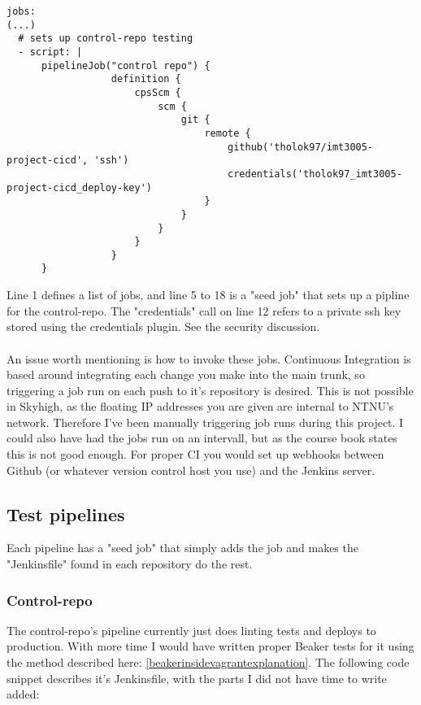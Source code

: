 \begin{verbatim}
jobs:
(...)
  # sets up control-repo testing
  - script: |
      pipelineJob("control repo") {
                  definition {
                      cpsScm {
                          scm {
                              git {
                                  remote {
                                      github('tholok97/imt3005-project-cicd', 'ssh')
                                      credentials('tholok97_imt3005-project-cicd_deploy-key')
                                  }
                              }
                          }
                      }
                  }
      }
\end{verbatim}

Line 1 defines a list of jobs, and line 5 to 18 is a "seed job" that sets up a pipline for the control-repo. The "credentials" call on line 12 refers to a private ssh key stored using the credentials plugin. See the security discussion.
\\
\\
An issue worth mentioning is how to invoke these jobs. Continuous Integration is based around integrating each change you make into the main trunk, so triggering a job run on each push to it's repository is desired. This is not possible in Skyhigh, as the floating IP addresses you are given are internal to NTNU's network. Therefore I've been manually triggering job runs during this project. I could also have had the jobs run on an intervall, but as the course book\cite{coursebook} states this is not good enough. For proper CI you would set up webhooks between Github (or whatever version control host you use) and the Jenkins server. 

\subsection{Test pipelines}

Each pipeline has a "seed job" that simply adds the job and makes the "Jenkinsfile" found in each repository do the rest. 

\subsubsection{Control-repo}

The control-repo's pipeline currently just does linting tests and deploys to production. With more time I would have written proper Beaker tests for it using the method described here: \ref{beakerinsidevagrantexplanation}. The following code snippet describes it's Jenkinsfile, with the parts I did not have time to write added:

